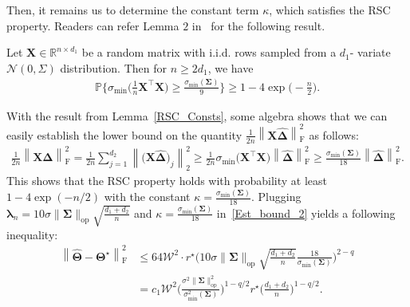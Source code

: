 \documentclass[alpha-refs]{wiley-article}
\begin{document}
\noindent
Then, it remains us to determine the constant term $\kappa$, which satisfies the RSC property.
Readers can refer Lemma $2$ in~\citet{negahban2011estimation} for the following result.
\begin{lemma}\label{RSC_Consts}
Let $\boldsymbol{X} \in \mathbb{R}^{n \times d_{1}}$ be a random matrix with i.i.d. rows sampled from a $d_{1}$-
variate $\mathcal{N}(0,\Sigma)$ distribution. Then for $n \geq 2d_{1}$, we have
\begin{align*}
    \mathbb{P}\Bigg\{ \sigma_{\text{min}}\bigg(\frac{1}{n}\boldsymbol{X}^{\top}\boldsymbol{X}\bigg) \geq \frac{\sigma_{\text{min}}(\boldsymbol{\Sigma})}{9} \Bigg\} \geq 1 - 4\exp \bigg( -\frac{n}{2} \bigg).
\end{align*}
\end{lemma}
\noindent
With the result from Lemma~\ref{RSC_Consts}, some algebra shows that
we can easily establish the lower bound on the quantity $\frac{1}{2n} \left\| \boldsymbol{X}\boldsymbol{\widehat{\Delta}} \right\|_{\text{F}}^{2}$ as follows:
\begin{align*}
    \frac{1}{2n} \left\| \boldsymbol{X}\boldsymbol{\widehat{\Delta}} \right\|_{\text{F}}^{2}
    = \frac{1}{2n} \sum_{j=1}^{d_{2}} \left\| \big(\boldsymbol{X}\boldsymbol{\widehat{\Delta}}\big)_{j} \right\|_{2}^{2}
    \geq \frac{1}{2n}\sigma_{\text{min}}\big( \boldsymbol{X}^{\top} \boldsymbol{X} \big)
    \left\| \boldsymbol{\widehat{\Delta}} \right\|_{\text{F}}^{2}
    \geq \frac{\sigma_{\text{min}}(\boldsymbol{\Sigma})}{18} \left\| \boldsymbol{\widehat{\Delta}} \right\|_{\text{F}}^{2}.
\end{align*}
This shows that the RSC property holds with probability at least $ 1 - 4\exp ( -n/2 )$ with the constant $\kappa=\frac{\sigma_{\text{min}}(\boldsymbol{\Sigma})}{18}$.
Plugging $\boldsymbol{\lambda}_{n}=10 \sigma \|\boldsymbol{\Sigma}\|_{\text{op}} \sqrt{\frac{d_{1}+d_{2}}{n}}$ and $\kappa = \frac{\sigma_{\text{min}}(\boldsymbol{\Sigma})}{18}$ in~\eqref{Est_bound_2} yields a following inequality:
\begin{align*}
    \left\| \widehat{\boldsymbol{\Theta}} - \boldsymbol{\Theta^{\star}} \right\|_{\text{F}}^{2}
    &\leq 64 \mathcal{W}^{2} \cdot r^{\star} \Bigg(10 \sigma \|\boldsymbol{\Sigma}\|_{\text{op}} \sqrt{\frac{d_{1}+d_{2}}{n}} \frac{18}{\sigma_{\text{min}}(\boldsymbol{\Sigma})} \Bigg)^{2-q} \\
    &= c_{1} \mathcal{W}^{2} \Bigg( \frac{\sigma^{2}\|\boldsymbol{\Sigma}\|_{\text{op}}^{2}}{\sigma_{\text{min}}^{2}(\boldsymbol{\Sigma})} \Bigg)^{1-q/2} r^{\star} \Bigg( \frac{d_{1}+d_{2}}{n} \Bigg)^{1-q/2}.
\end{align*}
\end{document}
